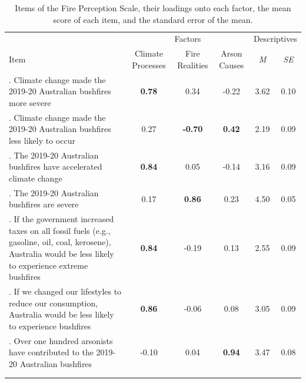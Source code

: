 \documentclass[
  letterpaper,
  DIV=11,
  numbers=noendperiod]{scrartcl}
\begin{document}
\hypertarget{tbl-fps-loadings}{}
\begin{table}
\caption{\label{tbl-fps-loadings}Items of the Fire Perception Scale, their loadings onto each factor, the
mean score of each item, and the standard error of the mean. }\tabularnewline

\centering
\begin{tabular}[t]{>{\raggedright\arraybackslash}p{18em}ccccc}
\toprule
\multicolumn{1}{c}{ } & \multicolumn{3}{c}{Factors} & \multicolumn{2}{c}{Descriptives} \\
\cmidrule(l{3pt}r{3pt}){2-4} \cmidrule(l{3pt}r{3pt}){5-6}
Item & \parbox{5em}{\centering Climate Processes} & \parbox{5em}{\centering Fire Realities} & \parbox{5em}{\centering Arson Causes} & \textit{M} & \textit{SE}\\
. Climate change made the 2019-20 Australian bushfires more severe & \textbf{0.78} & 0.34 & -0.22 & 3.62 & 0.10\\
2. Climate change made the 2019-20 Australian bushfires less likely to occur & 0.27 & \textbf{-0.70} & \textbf{0.42} & 2.19 & 0.09\\
3. The 2019-20 Australian bushfires have accelerated climate change & \textbf{0.84} & 0.05 & -0.14 & 3.16 & 0.09\\
4. The 2019-20 Australian bushfires are severe & 0.17 & \textbf{0.86} & 0.23 & 4.50 & 0.05\\
5. If the government increased taxes on all fossil fuels (e.g., gasoline, oil, coal, kerosene), Australia would be less likely to experience extreme bushfires & \textbf{0.84} & -0.19 & 0.13 & 2.55 & 0.09\\
6. If we changed our lifestyles to reduce our consumption, Australia would be less likely to experience bushfires & \textbf{0.86} & -0.06 & 0.08 & 3.05 & 0.09\\
7. Over one hundred arsonists have contributed to the 2019-20 Australian bushfires & -0.10 & 0.04 & \textbf{0.94} & 3.47 & 0.08\\
\bottomrule
{}\\
\\
\end{tabular}
\end{table}
\end{document}
